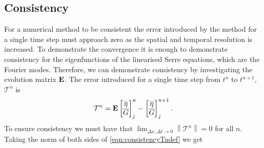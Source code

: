 



\subsection{Consistency}
For a numerical method to be consistent the error introduced by the method for a single time step must approach zero as the spatial and temporal resolution is increased. To demonstrate the convergence it is enough to demonstrate consistency for the eigenfunctions of the linearised Serre equations, which are the Fourier modes. Therefore, we can demonstrate consistency by investigating the evolution matrix $\mathbf{E}$. The error introduced for a single time step from $t^n$ to $t^{n+1}$, $\mathcal{T}^n$ is
\begin{equation}
\mathcal{T}^n =  \mathbf{E}\begin{bmatrix}
\overline{\eta} \\ \overline{G}
\end{bmatrix}^{n}_j -  \begin{bmatrix}
\overline{\eta} \\ \overline{G}
\end{bmatrix}^{n+1}_j.
\label{eqn:consistencyTndef}
\end{equation}
To ensure consistency we must have that $ \lim_{\Delta x,\Delta t \rightarrow 0}\left \| \mathcal{T}^n \right \| = 0 $ for all $n$. Taking the norm of both sides of \eqref{eqn:consistencyTndef} we get

